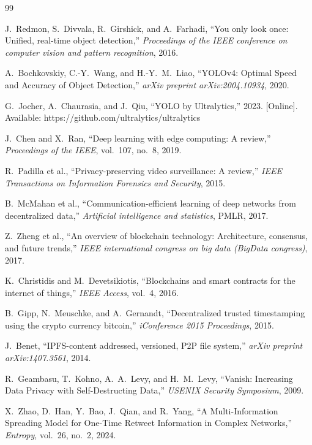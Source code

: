 \documentclass[conference]{IEEEtran}
\begin{document}
\begin{thebibliography}{99}

J.~Redmon, S.~Divvala, R.~Girshick, and A.~Farhadi,
``You only look once: Unified, real-time object detection,''
\textit{Proceedings of the IEEE conference on computer vision and pattern recognition}, 2016.

A.~Bochkovskiy, C.-Y.~Wang, and H.-Y.~M.~Liao,
``YOLOv4: Optimal Speed and Accuracy of Object Detection,''
\textit{arXiv preprint arXiv:2004.10934}, 2020.

G.~Jocher, A.~Chaurasia, and J.~Qiu,
``YOLO by Ultralytics,'' 2023. [Online]. Available: https://github.com/ultralytics/ultralytics

J.~Chen and X.~Ran,
``Deep learning with edge computing: A review,''
\textit{Proceedings of the IEEE}, vol.~107, no.~8, 2019.

R.~Padilla et al.,
``Privacy-preserving video surveillance: A review,''
\textit{IEEE Transactions on Information Forensics and Security}, 2015.

B.~McMahan et al.,
``Communication-efficient learning of deep networks from decentralized data,''
\textit{Artificial intelligence and statistics}, PMLR, 2017.

Z.~Zheng et al.,
``An overview of blockchain technology: Architecture, consensus, and future trends,''
\textit{IEEE international congress on big data (BigData congress)}, 2017.

K.~Christidis and M.~Devetsikiotis,
``Blockchains and smart contracts for the internet of things,''
\textit{IEEE Access}, vol.~4, 2016.

B.~Gipp, N.~Meuschke, and A.~Gernandt,
``Decentralized trusted timestamping using the crypto currency bitcoin,''
\textit{iConference 2015 Proceedings}, 2015.

J.~Benet,
``IPFS-content addressed, versioned, P2P file system,''
\textit{arXiv preprint arXiv:1407.3561}, 2014.

R.~Geambasu, T.~Kohno, A.~A.~Levy, and H.~M.~Levy,
``Vanish: Increasing Data Privacy with Self-Destructing Data,''
\textit{USENIX Security Symposium}, 2009.

X.~Zhao, D.~Han, Y.~Bao, J.~Qian, and R.~Yang,
``A Multi-Information Spreading Model for One-Time Retweet Information in Complex Networks,''
\textit{Entropy}, vol.~26, no.~2, 2024.


\end{thebibliography}
\end{document}
